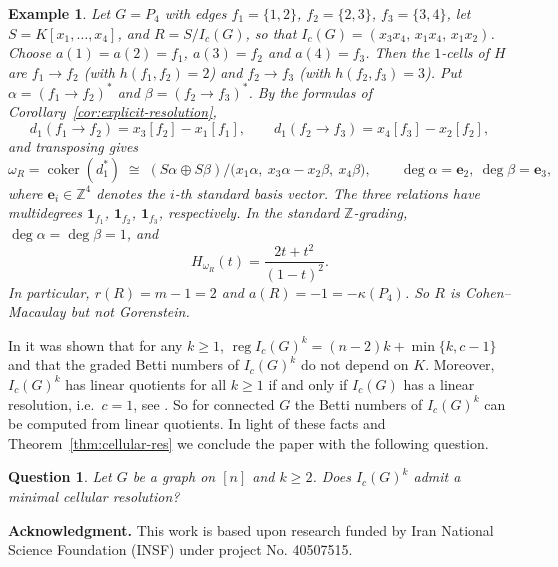 \documentclass[12pt]{amsart}
\newtheorem{Example}[Theorem]{Example}
\newtheorem{Question}[Theorem]{Question}
\begin{document}
\begin{Example}
{\em Let $G=P_4$ with edges $f_1=\{1,2\}$, $f_2=\{2,3\}$, $f_3=\{3,4\}$, let $S=K[x_1,\dots,x_4]$, and $R=S/I_c(G)$, so that $I_c(G)=(x_3x_4,\,x_1x_4,\,x_1x_2)$. Choose $a(1)=a(2)=f_1$, $a(3)=f_2$ and $a(4)=f_3$. Then the $1$-cells of $H$ are $f_1\to f_2$ (with $h(f_1,f_2)=2$) and $f_2\to f_3$ (with $h(f_2,f_3)=3$). Put $\alpha=(f_1\to f_2)^*$ and $\beta=(f_2\to f_3)^*$. By the formulas of Corollary~\ref{cor:explicit-resolution},
\[
d_1(f_1\to f_2)=x_3[f_2]-x_1[f_1],\qquad d_1(f_2\to f_3)=x_4[f_3]-x_2[f_2],
\]
and transposing gives
\[
\omega_R=\operatorname{coker}(d_1^*)\;\cong\;(S\alpha\oplus S\beta)\big/\big(x_1\alpha,\ x_3\alpha-x_2\beta,\ x_4\beta\big),
\qquad \deg\alpha=\mathbf e_2,\ \deg\beta=\mathbf e_3,
\]
where $\mathbf e_i\in\mathbb Z^4$ denotes the $i$-th standard basis vector. The three relations have multidegrees $\mathbf 1_{f_1}$, $\mathbf 1_{f_2}$, $\mathbf 1_{f_3}$, respectively. In the standard $\mathbb Z$-grading, $\deg\alpha=\deg\beta=1$, and
\[
H_{\omega_R}(t)=\frac{2t+t^{2}}{(1-t)^{2}}.
\]
In particular, $r(R)=m-1=2$ and $a(R)=-1=-\kappa(P_4)$. So $R$ is Cohen--Macaulay but not Gorenstein.
}
\end{Example}

In  \cite{fm2025}  it was shown that for any $k\geq 1$,   $\operatorname{reg} I_c(G)^k=(n-2)k+\min\{k,c-1\}$  and that the
graded Betti numbers of $I_c(G)^k$ do not depend on $K$. Moreover,
$I_c(G)^k$ has linear quotients for all $k\ge1$ if and only if
$I_c(G)$ has a linear resolution, i.e.\ $c=1$, see \cite[Corollary 3.2]{fmStanley-Reisner2025}. 
So for connected $G$ the Betti numbers of $I_c(G)^k$ can be computed from linear quotients. In light of these facts and Theorem~\ref{thm:cellular-res}  we conclude the paper with the following question.

\begin{Question}
Let $G$ be a graph on $[n]$ and $k\ge2$. Does $I_c(G)^k$ admit a minimal cellular
resolution? 
\end{Question}



			\bigskip
			
\textbf{Acknowledgment.} This work is based upon research funded by Iran National Science Foundation (INSF) under project No. 40507515.
			\bigskip
			
\end{document}
